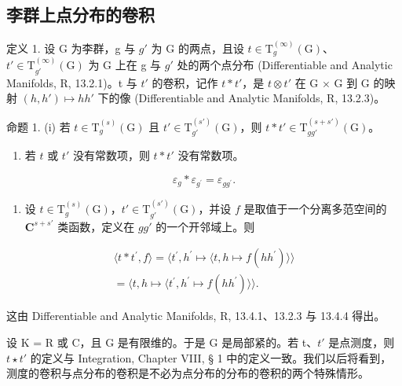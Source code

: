 \subsection{李群上点分布的卷积}

定义 1. 设 G 为李群，g 与 \(g'\) 为 G 的两点，且设 \(t \in \mathrm{T}_{g}^{(\infty)}(\mathrm{G})\)、\(t' \in \mathrm{T}_{g'}^{(\infty)}(\mathrm{G})\) 为 G 上在 g 与 \(g'\) 处的两个点分布 (Differentiable and Analytic Manifolds, R, 13.2.1)。t 与 \(t'\) 的卷积，记作 \(t * t'\)，是 \(t \otimes t'\) 在 G × G 到 G 的映射 \((h, h') \mapsto hh'\) 下的像 (Differentiable and Analytic Manifolds, R, 13.2.3)。

命题 1. (i) 若 \(t \in \mathrm{T}_g^{(s)}(\mathrm{G})\) 且 \(t' \in \mathrm{T}_{g'}^{(s')}(\mathrm{G})\)，则 \(t * t' \in \mathrm{T}_{gg'}^{(s + s')}(\mathrm{G})\)。

\begin{enumerate}
\def\labelenumi{(\roman{enumi})}
\setcounter{enumi}{1}
\tightlist
\item
  若 \(t\) 或 \(t'\) 没有常数项，则 \(t * t'\) 没有常数项。
\end{enumerate}

\[
\varepsilon_ {g} * \varepsilon_ {g ^ {\prime}} = \varepsilon_ {g g ^ {\prime}}.
\]

\begin{enumerate}
\def\labelenumi{(\roman{enumi})}
\setcounter{enumi}{3}
\tightlist
\item
  设 \(t \in \mathrm{T}_g^{(s)}(\mathrm{G})\)，\(t' \in \mathrm{T}_{g'}^{(s')}(\mathrm{G})\)，并设 \(f\) 是取值于一个分离多范空间的 \(\mathbf{C}^{s + s'}\) 类函数，定义在 \(gg'\) 的一个开邻域上。则
\end{enumerate}

\[
\begin{array}{c} \langle t * t ^ {\prime}, f \rangle = \langle t ^ {\prime}, h ^ {\prime} \mapsto \langle t, h \mapsto f (h h ^ {\prime}) \rangle \rangle \\ = \langle t, h \mapsto \langle t ^ {\prime}, h ^ {\prime} \mapsto f (h h ^ {\prime}) \rangle \rangle . \end{array}
\]

这由 Differentiable and Analytic Manifolds, R, 13.4.1、13.2.3 与 13.4.4 得出。

设 K = R 或 C，且 G 是有限维的。于是 G 是局部紧的。若 t、\(t'\) 是点测度，则 \(t \star t'\) 的定义与 Integration, Chapter VIII, § 1 中的定义一致。我们以后将看到，测度的卷积与点分布的卷积是不必为点分布的分布的卷积的两个特殊情形。

